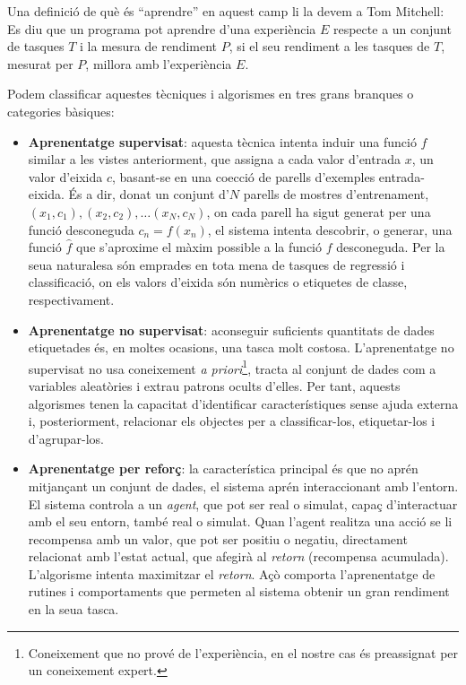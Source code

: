 Una definició de què és ``aprendre'' en aquest camp li la devem a Tom Mitchell\cite{mit97machinelearning}:\\
\guillemotleft Es diu que un programa pot aprendre d'una experiència $E$ respecte a un conjunt de tasques $T$ i la mesura de rendiment $P$, si el seu rendiment a les tasques de $T$, mesurat per $P$, millora amb l'experiència $E$\guillemotright.

Podem classificar aquestes tècniques i algorismes en tres grans branques o categories bàsiques:

\begin{itemize}
    \item \textbf{Aprenentatge supervisat}: aquesta tècnica intenta induir una funció $f$ similar a les vistes anteriorment, que assigna a cada valor d'entrada $x$, un valor d'eixida $c$, basant-se en una co\lgem ecció de parells d'exemples entrada-eixida.
    És a dir, donat un conjunt d'$N$ parells de mostres d'entrenament, $(x_1, c_1), (x_2, c_2), \dots (x_N, c_N)$, on cada parell ha sigut generat per una funció desconeguda $c_n = f(x_n)$, el sistema intenta descobrir, o generar, una funció $\hat{f}$ que s'aproxime el màxim possible a la funció $f$ desconeguda.
    Per la seua naturalesa són emprades en tota mena de tasques de regressió i classificació, on els valors d'eixida són numèrics o etiquetes de classe, respectivament.

    \item \textbf{Aprenentatge no supervisat}: aconseguir suficients quantitats de dades etiquetades és, en moltes ocasions, una tasca molt costosa. L'aprenentatge no supervisat no usa coneixement \textit{a priori}\footnote{Coneixement que no prové de l'experiència, en el nostre cas és preassignat per un coneixement expert.}, tracta al conjunt de dades com a variables aleatòries i extrau patrons ocults d'elles.
    Per tant, aquests algorismes tenen la capacitat d'identificar característiques sense ajuda externa i, posteriorment, relacionar els objectes per a classificar-los, etiquetar-los i d'agrupar-los.

    \item \textbf{Aprenentatge per reforç}: la característica principal és que no aprén mitjançant un conjunt de dades, el sistema aprén interaccionant amb l'entorn.
    El sistema controla a un \emph{agent}, que pot ser real o simulat, capaç d'interactuar amb el seu entorn, també real o simulat. Quan l'agent realitza una acció se li recompensa amb un valor, que pot ser positiu o negatiu, directament relacionat amb l'estat actual, que afegirà al \textit{retorn} (recompensa acumulada).
    L'algorisme intenta maximitzar el \textit{retorn}. Açò comporta l'aprenentatge de rutines i comportaments que permeten al sistema obtenir un gran rendiment en la seua tasca.
\end{itemize}

